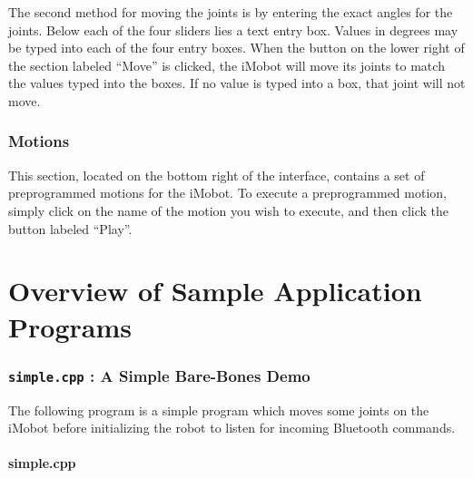 \documentclass[11pt]{report}
\begin{document}
The second method for moving the joints is by entering the exact angles for the
joints. Below each of the four sliders lies a text entry box. Values in degrees
may be typed into each of the four entry boxes. When the button on the lower
right of the section labeled ``Move'' is clicked, the iMobot will move its joints
to match the values typed into the boxes. If no value is typed into a box, that 
joint will not move.

\subsection{Motions}
This section, located on the bottom right of the interface, contains a set of
preprogrammed motions for the iMobot. To execute a preprogrammed motion, simply
click on the name of the motion you wish to execute, and then click the button
labeled ``Play''.


\chapter{Overview of Sample Application Programs}
\subsection{\texttt{simple.cpp} : A Simple Bare-Bones Demo}
The following program is a simple program which moves some joints on the iMobot
before initializing the robot to listen for incoming Bluetooth commands.
\subsubsection{simple.cpp \label{subsec:simple.cpp}}
\end{document}
